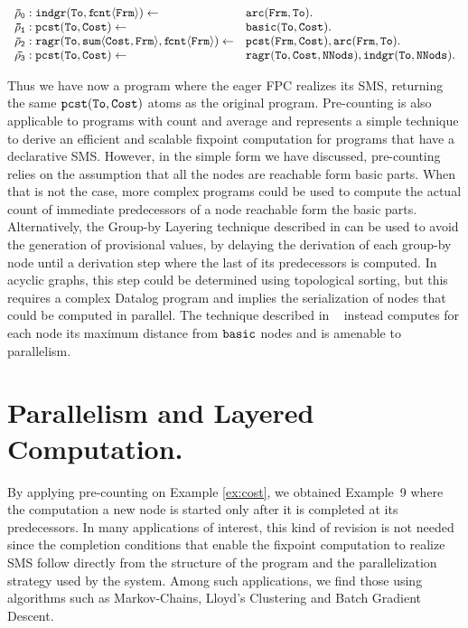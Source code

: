 \documentclass[11pt]{article}
\def\mt{\tt}
\newcommand{\cldl}{\[\begin{array}{ll}}
\newcommand{\eldl}{\end{array}\]\rm}
\newcommand{\prule}[2]{ \mt #1 \leftarrow & \mt #2 \\}
\def\inv{\vspace{-0.2cm}}
\def\sinv{\vspace{-0.1cm}}
\def\inv{\vspace{-0.2cm}}
\def\sinv{\vspace{-0.1cm}}
\begin{document}
 \begin{example} 
\label{ex:below}

~\\[-0.7cm]

\cldl
 \prule {\bar{\rho}_0: indgr(To, f\!cnt\langle Frm \rangle )}{arc(Frm, To).}
 \prule {\bar{\rho}_1: pcst(To, Cost)}{basic(To, Cost).}
 \prule{\bar{\rho}_2:  ragr(To, sum\langle  Cost, Frm \rangle, f\!cnt \langle  Frm \rangle)}
{pcst(Frm, Cost),  arc(Frm, To).}
 \prule{\bar{\rho_3}:  pcst(To, Cost)} {ragr(To, Cost, NNods), indgr(To, NNods).}
 \eldl
\end{example}

Thus we have now a program where  the eager FPC realizes its SMS,
returning the same $\tt pcst(To, Cost)$ atoms as the original program.  
Pre-counting  is also applicable to programs with count and average and
 represents a simple technique to derive an efficient and scalable fixpoint computation for
programs that have a declarative SMS. However, in the simple form we have discussed, pre-counting
relies on the assumption that all the nodes are reachable form basic parts. When
that is not the case, more complex programs could be used to compute the actual
count of immediate predecessors of a node reachable form the basic parts. Alternatively, 
the Group-by Layering  technique described  in \cite{submitted}  can be used   to avoid 
the generation of provisional values, by delaying the derivation of each group-by node 
 until a derivation step where the last of its predecessors is computed. In acyclic graphs, this step
could be determined using topological sorting, but this requires a complex Datalog
program and  implies the serialization of  nodes that could be computed in parallel.
The technique described in ~\cite{submitted} instead computes for each node 
its maximum distance  from $\tt basic$ nodes and is amenable to parallelism.

\inv \section{\large Parallelism and Layered Computation.}
\sinv  By applying pre-counting  on Example \ref{ex:cost},   we obtained Example~9  
where the computation a new node is started only after it is completed at its
predecessors. In many
applications of interest, this kind  of revision  is not  needed since  the
completion conditions that enable  the fixpoint computation  to realize SMS follow directly
from the structure of the program and  the parallelization  strategy used by the system. 
 Among such applications, we find those using algorithms such as Markov-Chains,  Lloyd's Clustering and Batch Gradient Descent.
\end{document}
